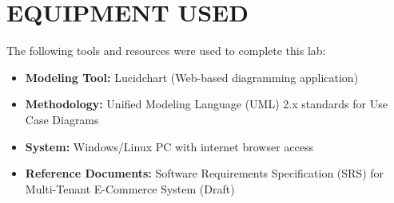 \chapter{EQUIPMENT USED}
\label{ch:eqp_used}
The following tools and resources were used to complete this lab:
\begin{itemize}
    \item \textbf{Modeling Tool:} Lucidchart (Web-based diagramming application)
    \item \textbf{Methodology:} Unified Modeling Language (UML) 2.x standards for Use Case Diagrams
    \item \textbf{System:} Windows/Linux PC with internet browser access
    \item \textbf{Reference Documents:} Software Requirements Specification (SRS) for Multi-Tenant E-Commerce System (Draft)
\end{itemize}
\clearpage




